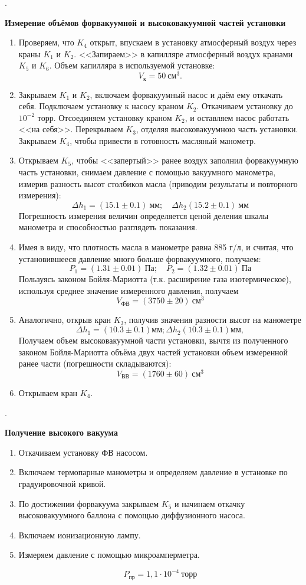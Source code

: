 \documentclass[a4paper, 12pt]{article}
\newcounter{Points}
\newcommand{\point}{\arabic{Points}. \addtocounter{Points}{1}}
\begin{document}
\point \textbf{Измерение объёмов форвакуумной и высоковакуумной частей установки}
	\begin{enumerate}
		\item Проверяем, что $K_4$ открыт, впускаем в установку атмосферный воздух через краны $K_1$ и $K_2$. <<Запираем>> в капилляре атмосферный воздух кранами $K_5$ и $K_6$. Объем капилляра в используемой установке: $$V_\text{к} = 50~ \text{см}^3.$$
		\item Закрываем $K_1$ и $K_2$, включаем форвакуумный насос и даём ему откачать себя. Подключаем установку к насосу краном $K_2$. Откачиваем установку до $10^{-2}$ торр. Отсоединяем установку краном $K_2$, и оставляем насос работать <<на себя>>. Перекрываем  $K_3$, отделяя высоковакуумною часть установки. Закрываем  $K_4$, чтобы привести в готовность масляный манометр.
		\item Открываем  $K_5$, чтобы <<запертый>> ранее воздух заполнил форвакуумную часть установки, снимаем давление с помощью вакуумного манометра, измерив разность высот столбиков масла (приводим результаты и повторного измерения):
		$$
		\Delta h_1 = (15.1\pm0.1) ~\text{мм};\quad \Delta h_2 (15.2\pm0.1) ~\text{мм}
		$$
		Погрешность измерения величин определяется ценой деления шкалы манометра и способностью разглядеть показания.
		\item Имея в виду, что плотность масла в манометре равна 885 г/л, и считая, что установившееся давление много больше форвакуумного, получаем:
		$$
		P_1 = (1.31\pm0.01)~\text{Па};\quad P_2 = (1.32\pm0.01)~\text{Па}
		$$
		Пользуясь законом Бойля-Мариотта (т.к. расширение газа изотермическое), используя среднее значение измеренного давления, получаем
		$$
		V_\text{ФВ} = (3750\pm20)~\text{см}^3
		$$
		\item Аналогично, открыв кран $K_3$, получив значения разности высот на манометре
		$$
		\Delta h_1 = (10.3\pm0.1) \text{мм}; \Delta h_2 (10.3\pm0.1) \text{мм},
		$$
		Получаем объем высоковакуумной части установки, вычтя из полученного законом Бойля-Мариотта объёма двух частей установки объем измеренной ранее части (погрешности складываются):
		$$
		V_\text{ВВ} = (1760\pm60)~\text{см}^3
		$$
		\item Открываем кран $K_4$.
	\end{enumerate}

\point  \textbf{Получение высокого вакуума}
	\begin{enumerate}
	\item Откачиваем установку ФВ насосом.
	\item Включаем термопарные манометры и определяем давление в установке по градуировочной кривой.
	\item По достижении форвакуума закрываем $K_5$ и начинаем откачку высоковакуумного баллона с помощью диффузионного насоса.
	\item Включаем ионизационную лампу.
	\item Измеряем давление с помощью микроамперметра.
	
	$$P_{\text{пр}} = 1,1\cdot10^{-4} ~\text{торр}$$	
\end{enumerate}
\end{document}
